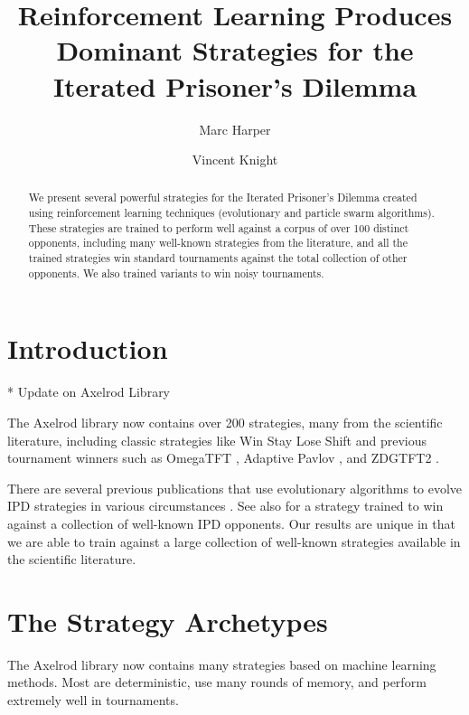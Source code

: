 \documentclass{article}
\title{Reinforcement Learning Produces Dominant Strategies for the
Iterated Prisoner's Dilemma}
\author{Marc Harper \and Vincent Knight} %
\date{}
\begin{document}
\maketitle


\begin{abstract}
    We present several powerful strategies for the Iterated
    Prisoner's Dilemma created using reinforcement learning techniques
    (evolutionary and particle swarm algorithms). These strategies are
    trained to perform well against a corpus of over 100 distinct
    opponents, including many well-known strategies from the literature, and all
    the trained strategies win standard tournaments against the total collection
    of other opponents. We also trained variants to win noisy tournaments.
\end{abstract} 

\section{Introduction}\label{sec:introduction}

* Update on Axelrod Library

The Axelrod library \cite{knight2016open} now contains over 200 strategies,
many from the scientific
literature, including classic strategies like Win Stay Lose Shift
\cite{nowak1993strategy} and
previous tournament winners such as OmegaTFT \cite{slany2007some},
 Adaptive Pavlov \cite{li2007design}, and ZDGTFT2 \cite{stewart2012extortion}.


There are several previous publications that use evolutionary algorithms to
evolve IPD strategies in various circumstances \cite{fogel1993evolving} \cite{ashlock2006training}
\cite{ashlock2006changes} \cite{vassiliades2010multiagent} \cite{ashlock2014shaped}
\cite{ashlock2014evolution} \cite{ashlock2015multiple} \cite{barlow2015varying}
\cite{sudo2015effects}. See also \cite{gaudesi2016exploiting} for a strategy trained to win against
a collection of well-known IPD opponents. Our results are unique in that we are
able to train against a large collection of well-known strategies available in
the scientific literature.

\section{The Strategy Archetypes}

The Axelrod library now contains many strategies based on machine learning
methods. Most are deterministic, use many rounds of memory, and perform
extremely well in tournaments.
\end{document}
